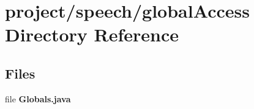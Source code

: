 \section{project/speech/global\+Access Directory Reference}
\label{dir_3423647a1c1acd3d3da3a2332f0d085a}
\subsection*{Files}
\begin{DoxyCompactItemize}
\item 
file {\bfseries Globals.\+java}
\end{DoxyCompactItemize}
